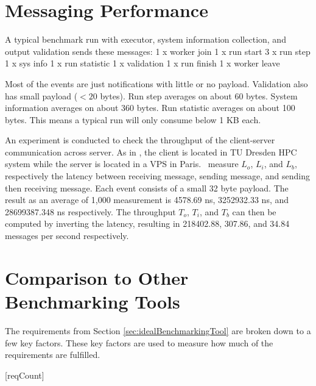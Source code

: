 \section{Messaging Performance}

A typical benchmark run with executor, system information collection, and output validation sends these messages:
1 x worker join
1 x run start
3 x run step
1 x sys info
1 x run statistic
1 x validation
1 x run finish
1 x worker leave

Most of the events are just notifications with little or no payload.
Validation also has small payload ($< 20$ bytes).
Run step averages on about 60 bytes.
System information averages on about 360 bytes.
Run statistic averages on about 100 bytes.
This means a typical run will only consume below 1 KB each.

An experiment is conducted to check the throughput of the client-server communication across server.
As in , the client is located in TU Dresden HPC system while the server is located in a VPS in Paris.
\First~measure \(L_o\), \(L_i\), and \(L_b\), respectively the latency between receiving message, sending message, and sending then receiving message.
Each event consists of a small 32 byte payload.
The result as an average of 1,000 measurement is 4578.69 ns, 3252932.33 ns, and 28699387.348 ns respectively.
The throughput \(T_o\), \(T_i\), and \(T_b\) can then be computed by inverting the latency, resulting in 218402.88, 307.86, and 34.84 messages per second respectively.

\section{Comparison to Other Benchmarking Tools}
\label{sec:prior_works.method}

The requirements from Section \ref{sec:idealBenchmarkingTool} are broken down to a few key factors.
These key factors are used to measure how much of the requirements are fulfilled.

[reqCount]
\newcommand{\reqLabel}[1]{
	\setcounter{reqFactorCount}{0}
	\addtocounter{reqCount}{1}
	\arabic{reqCount}.
	#1
}
\newcommand{\reqFactor}[1]{
	\addtocounter{reqFactorCount}{1}
	(\alph{reqFactorCount}) #1
}

